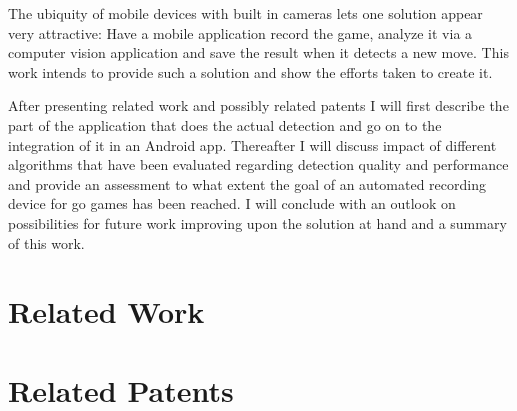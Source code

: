 	The ubiquity of mobile devices with built in cameras lets one solution appear very attractive: Have a mobile application record the game, analyze it via a computer vision application and save the result when it detects a new move. This	work intends to provide such a solution and show the efforts taken to create it.

	After presenting related work and possibly related patents I will first describe the part of the application that does the actual detection and go on to the integration of it in an Android app. Thereafter I will discuss impact of different algorithms that have been evaluated regarding detection quality and performance and provide an assessment to what extent the goal of an automated recording device for go games has been reached. I will conclude with an outlook on possibilities for future work improving upon the solution at hand and a summary of this work.


	\section{Related Work}
	\section{Related Patents}

